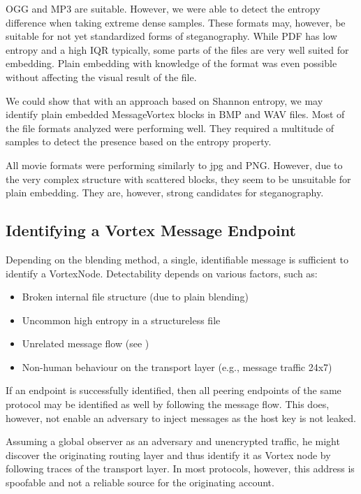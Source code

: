 OGG and MP3 are suitable. However, we were able to detect the entropy difference when taking extreme dense samples. These formats may, however, be suitable for not yet standardized forms of steganography. While PDF has low entropy and a high IQR typically, some parts of the files are very well suited for embedding. Plain embedding with knowledge of the format was even possible without affecting the visual result of the file.

We could show that with an approach based on Shannon entropy, we may identify plain embedded MessageVortex blocks in BMP and WAV files. Most of the file formats analyzed were performing well. They required a multitude of samples to detect the presence based on the entropy property.

All movie formats were performing similarly to jpg and PNG. However, due to the very complex structure with scattered blocks, they seem to be unsuitable for plain embedding. They are, however, strong candidates for steganography.

\subsection{Identifying a Vortex Message Endpoint}
Depending on the blending method, a single, identifiable message is sufficient to identify a VortexNode. Detectability depends on various factors, such as:

\begin{itemize}
	\item Broken internal file structure (due to plain blending)
	\item Uncommon high entropy in a structureless file
	\item Unrelated message flow (see \cite{oakland2013-parrot})
	\item Non-human behaviour on the transport layer (e.g., message traffic 24x7)
\end{itemize}

If an endpoint is successfully identified, then all peering endpoints of the same protocol may be identified as well by following the message flow. This does, however, not enable an adversary to inject messages as the host key is not leaked. 

Assuming a global observer as an adversary and unencrypted traffic, he might discover the originating routing layer and thus identify it as Vortex node by following traces of the transport layer. In most protocols, however, this address is spoofable and not a reliable source for the originating account.

